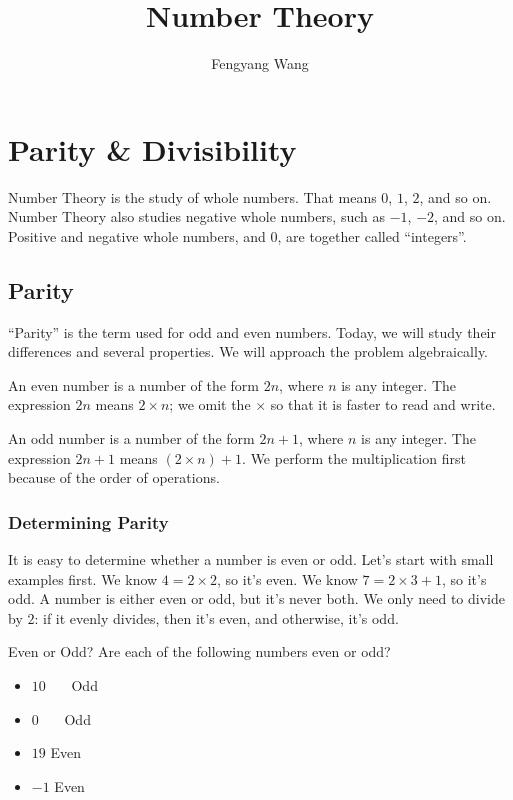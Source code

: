 \documentclass[a4paper,10pt]{report}
\title{Number Theory}
\author{Fengyang Wang}
\begin{document}
\maketitle

\chapter{Parity \& Divisibility}

Number Theory is the study of whole numbers. That means $0$, $1$, $2$, and so
on. Number Theory also studies negative whole numbers, such as $-1$, $-2$, and
so on. Positive and negative whole numbers, and $0$, are together called
``integers''.

\section{Parity}

``Parity'' is the term used for odd and even numbers. Today, we will study their
differences and several properties. We will approach the problem algebraically.

An even number is a number of the form $2n$, where $n$ is any integer. The
expression $2n$ means $2\times n$; we omit the $\times$ so that it is faster to
read and write.

An odd number is a number of the form $2n+1$, where $n$ is any integer. The
expression $2n+1$ means $(2\times n) + 1$. We perform the multiplication first
because of the order of operations.

\subsection{Determining Parity}
It is easy to determine whether a number is even or odd. Let's start with small
examples first. We know $4=2\times2$, so it's even. We know $7=2\times3+1$, so
it's odd. A number is either even or odd, but it's never both. We only need to
divide by $2$: if it evenly divides, then it's even, and otherwise, it's odd.

\begin{problem}{Even or Odd?}
 Are each of the following numbers even or odd?

 \begin{itemize}
  \item $10$ \hfill {}~~~Odd
  \item $0$ \hfill {}~~~Odd
  \item $19$ \hfill Even~~~
  \item $-1$ \hfill Even~~~
 \end{itemize}
\end{problem}
\end{document}
